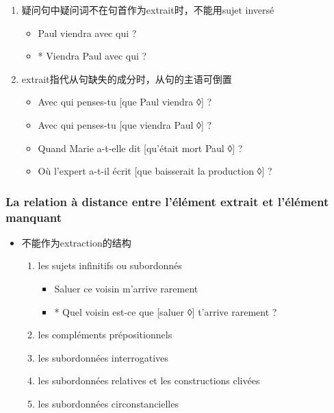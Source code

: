 \documentclass[UTF8]{report}
\begin{document}
\begin{enumerate}
\begin{itemize}
    \end{itemize}
    \item 疑问句中疑问词不在句首作为extrait时，不能用sujet inversé
    \begin{itemize}
        \item Paul viendra avec qui ?
        \item * Viendra Paul avec qui ?
    \end{itemize}
    \item extrait指代从句缺失的成分时，从句的主语可倒置
    \begin{itemize}
        \item Avec qui penses-tu [que Paul viendra ◊] ?
        \item Avec qui penses-tu [que viendra Paul ◊] ?
        \item Quand Marie a-t-elle dit [qu’était mort Paul ◊] ?
        \item Où l’expert a-t-il écrit [que baisserait la production ◊] ?
    \end{itemize}
\end{enumerate}


\subsubsection{La relation à distance entre l’élément extrait et l’élément manquant}
\begin{itemize}
    \item 不能作为extraction的结构
    \begin{enumerate}
        \item les sujets infinitifs ou subordonnés
        \begin{itemize}
            \item Saluer ce voisin m’arrive rarement
            \item  * Quel voisin est-ce que [saluer ◊] t’arrive rarement ?
        \end{itemize}
        \item les compléments prépositionnels
        \item les subordonnées interrogatives
        \item les subordonnées relatives et les constructions clivées
        \item les subordonnées circonstancielles
    \end{enumerate}
\end{itemize}
\end{document}
